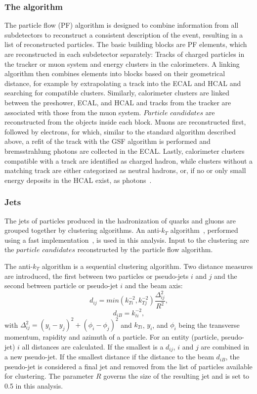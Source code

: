 \subsubsection{The algorithm}
The particle flow (PF) algorithm is designed to combine information from all subdetectors to reconstruct a consistent description of the event, resulting in a list of reconstructed particles. The basic building blocks are PF elements, which are reconstructed in each subdetector separately: Tracks of charged particles in the tracker or muon system and energy clusters in the calorimeters. A linking algorithm then combines elements into blocks based on their geometrical distance, for example by extrapolating a track into the ECAL and HCAL and searching for compatible clusters. Similarly, calorimeter clusters are linked between the preshower, ECAL, and HCAL and tracks from the tracker are associated with those from the muon system. $\textit{Particle candidates}$ are reconstructed from the objects inside each block. Muons are reconstructed first, followed by electrons, for which, similar to the standard algorithm described above, a refit of the track with the GSF algorithm is performed and bremsstrahlung photons are collected in the ECAL. Lastly, calorimeter clusters compatible with a track are identified as charged hadron, while clusters without a matching track are either categorized as neutral hadrons, or, if no or only small energy deposits in the HCAL exist, as photons~\cite{CMS-PAS-PFT-09-001}. 
\subsubsection{Jets}
The jets of particles produced in the hadronization of quarks and gluons are grouped together by clustering algorithms. An anti-$k_T$ algorithm~\cite{Cacciari:2008gp}, performed using a fast implementation~\cite{Cacciari:2011ma,Cacciari:2005hq}, is used in this analysis.  Input to the clustering are the $\textit{particle candidates}$ reconstructed by the particle flow algorithm.

The anti-$k_T$ algorithm is a sequential clustering algorithm. Two distance measures are introduced, the first between two particles or pseudo-jets $i$ and $j$ and the second between particle or pseudo-jet $i$ and the beam axis: 
\begin{equation}
d_{ij} = min(k_{Ti}^{-2},k_{Tj}^{-2})\frac{\Delta^2_{ij}}{R^2},
\end{equation}
\begin{equation}
d_{iB} = k_{ti}^{-2},
\end{equation}
with $\Delta_{ij}^2 = (y_i-y_j)^2 + (\phi_i - \phi_j)^2$ and $k_{Ti}$, $y_i$, and $\phi_i$ being the transverse momentum, rapidity and azimuth of a particle. For an entity (particle, pseudo-jet) $i$ all distances are calculated. If the smallest is a $d_{ij}$, $i$ and $j$ are combined in a new pseudo-jet. If the smallest distance if the distance to the beam $d_{iB}$, the pseudo-jet is considered a final jet and removed from the list of particles available for clustering. The parameter $R$ governs the size of the resulting jet and is set to 0.5 in this analysis. 

